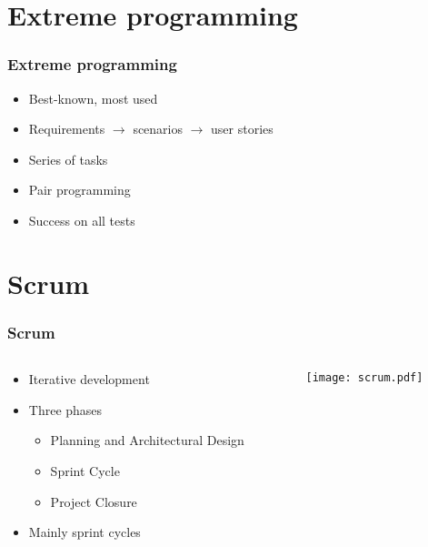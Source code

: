 \documentclass{beamer}
\begin{document}
\section{Extreme programming}
\begin{frame}
  \frametitle{Extreme programming}
  \begin{itemize}
	\item Best-known, most used
	\item Requirements $\rightarrow$ scenarios $\rightarrow$ user stories
	\item Series of tasks
	\item Pair programming
	\item Success on all tests
  \end{itemize}
\end{frame}


\section{Scrum}
\begin{frame}
\frametitle{Scrum}
  \begin{columns}[T]
    \begin{column}{.5\textwidth}
	  \begin{itemize}
		\item Iterative development
		\item Three phases
		\begin{itemize}
		  \item Planning and Architectural Design
		  \item Sprint Cycle
		  \item Project Closure
		\end{itemize}
	    \item Mainly sprint cycles
	  \end{itemize}
    \end{column}
    \begin{column}{.5\textwidth}
      \texttt{[image: scrum.pdf]}
    \end{column}
  \end{columns}
\end{frame}
\end{document}
